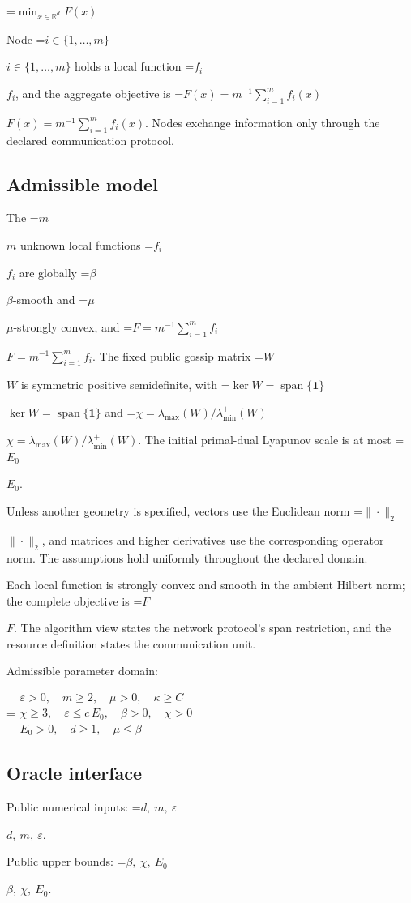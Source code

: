 \documentclass[10pt,a4paper]{article}
\newcommand{\AtlasMath}[1]{\par\begingroup\centering\setbox0=\hbox{$\displaystyle #1$}\ifdim\wd0>1.4\linewidth\typeout{ATLAS WIDE FORMULA: \the\wd0}\fi\ifdim\wd0>\linewidth\resizebox{\linewidth}{!}{\box0}\else\box0\fi\par\endgroup}
\newcommand{\AtlasInlineMath}[1]{\begingroup\setbox0=\hbox{$#1$}\ifdim\wd0>.4\linewidth\endgroup\AtlasMath{#1}\else\endgroup$#1$\fi}
\begin{document}
\AtlasMath{\min_{x\in \mathbb{R}^d}F(x)}


Node \AtlasInlineMath{i\in\{1,\ldots,m\}} holds a local function \AtlasInlineMath{f_i}, and the aggregate objective is \AtlasInlineMath{F(x)=m^{-1}\sum_{i=1}^m f_i(x)}. Nodes exchange information only through the declared communication protocol.

\subsection{Admissible model}
The \AtlasInlineMath{m} unknown local functions \AtlasInlineMath{f_i} are globally \AtlasInlineMath{\beta}-smooth and \AtlasInlineMath{\mu}-strongly convex, and \AtlasInlineMath{F=m^{-1}\sum_{i=1}^m f_i}. The fixed public gossip matrix \AtlasInlineMath{W} is symmetric positive semidefinite, with \AtlasInlineMath{\ker W=\operatorname{span}\{\mathbf1\}} and \AtlasInlineMath{\chi=\lambda_{\max}(W)/\lambda_{\min}^{+}(W)}. The initial primal-dual Lyapunov scale is at most \AtlasInlineMath{E_0}.

Unless another geometry is specified, vectors use the Euclidean norm \AtlasInlineMath{\|\cdot\|_2}, and matrices and higher derivatives use the corresponding operator norm. The assumptions hold uniformly throughout the declared domain.

Each local function is strongly convex and smooth in the ambient Hilbert norm; the complete objective is \AtlasInlineMath{F}. The algorithm view states the network protocol's span restriction, and the resource definition states the communication unit.

Admissible parameter domain:


\AtlasMath{\begin{gathered}\varepsilon > 0,\quad m \ge 2,\quad \mu > 0,\quad \kappa \ge C\\\chi \ge 3,\quad \varepsilon \le c\,E_0,\quad \beta > 0,\quad \chi > 0\\E_0 > 0,\quad d \ge 1,\quad \mu \le \beta\end{gathered}}


\subsection{Oracle interface}
Public numerical inputs: \AtlasInlineMath{d,\ m,\ \varepsilon}.

Public upper bounds: \AtlasInlineMath{\beta,\ \chi,\ E_0}.
\end{document}
